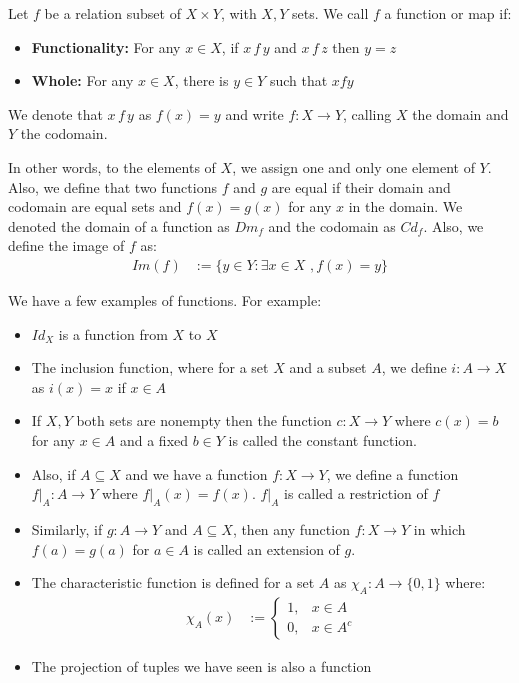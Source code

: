 \documentclass{tufte-handout}
\begin{document}
\begin{definition}[Function]
	Let $f$ be a relation subset of $X \times Y$, with $X, Y$ sets. We call $f$ a function or map if:
	\begin{itemize}
		\item \textbf{Functionality:} For any $x \in X$, if $x\, f\, y$ and $x\,f\,z$ then $y = z$
		\item \textbf{Whole:} For any $x \in X$, there is $y \in Y$ such that $xfy$
	\end{itemize}
	We denote that $x \, f\, y$ as $f(x) = y$ and write $f: X \to Y$, calling $X$ the domain and $Y$ the codomain.
\end{definition}

In other words, to the elements of $X$, we assign one and only one element of $Y$. Also, we define that two functions $f$ and $g$ are equal if their domain and codomain are equal sets and $f(x) = g(x)$ for any $x$ in the domain. We denoted the domain of a function as $Dm_f$ and the codomain as $Cd_f$. Also, we define the image of $f$ as:
\begin{align*}
	Im(f) &:= \{y \in Y: \exists x \in X \, \, ,f(x) = y\}
\end{align*}

We have a few examples of functions. For example:
\begin{itemize}
	\item  $Id_X$ is a function from $X$ to $X$
	\item The inclusion function, where for a set $X$ and a subset $A$, we define $i: A \to X$ as $i(x) = x$ if $x \in A$
	\item If $X, Y$ both sets are nonempty then the function $c: X \to Y$ where $c(x) = b$ for any $x \in A$ and a fixed $b \in Y$ is called the constant function.
	\item Also, if $A \subseteq X$ and we have a function $f: X \to Y$, we define a function $f|_A: A \to Y$ where $f|_A(x) = f(x)$. $f|_A$ is called a restriction of $f$
	\item Similarly, if $g: A \to Y$ and $A \subseteq X$, then any function $f: X \to Y$ in which $f(a) = g(a)$ for $a \in A$ is called an extension of $g$.
	\item The characteristic function is defined for a set $A$ as $\chi_A: A \to \{0, 1\}$ where:
	\begin{align*}
		\chi_A(x) &:= \begin{cases}
			1, &x \in A\\
			0, &x \in A^c
		\end{cases}
	\end{align*}
	\item The projection of tuples we have seen is also a function
\end{itemize}  
\end{document}

